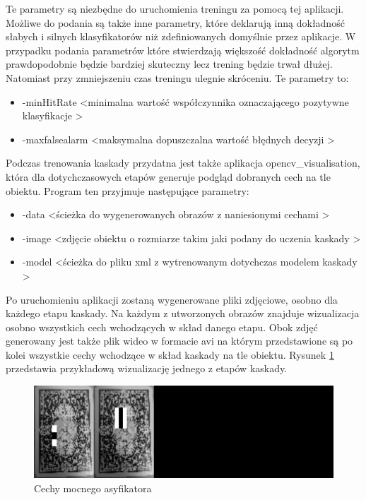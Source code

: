 Te parametry są niezbędne do uruchomienia treningu za pomocą tej aplikacji. Możliwe do podania są także inne parametry, które deklarują inną dokładność słabych i silnych klasyfikatorów niż zdefiniowanych domyślnie przez aplikacje. W przypadku podania parametrów które stwierdzają większość dokładność algorytm prawdopodobnie będzie bardziej skuteczny lecz trening będzie trwał dłużej. Natomiast przy zmniejszeniu czas treningu ulegnie skróceniu. Te parametry to:

\begin{itemize}
	\item -minHitRate \textless minimalna wartość współczynnika oznaczającego pozytywne klasyfikacje \textgreater
	\item -maxfalsealarm \textless maksymalna dopuszczalna wartość błędnych decyzji \textgreater
	
\end{itemize}

Podczas trenowania kaskady przydatna jest także aplikacja opencv\_visualisation, która dla dotychczasowych etapów generuje podgląd dobranych cech na tle obiektu. Program ten przyjmuje następujące parametry:

\begin{itemize}
	\item -data \textless ścieżka do wygenerowanych obrazów z naniesionymi cechami \textgreater
	\item -image \textless zdjęcie obiektu o rozmiarze takim jaki podany do uczenia kaskady \textgreater
	\item -model  \textless ścieżka do pliku xml z wytrenowanym dotychczas modelem kaskady \textgreater
	
\end{itemize}

Po uruchomieniu aplikacji zostaną wygenerowane pliki zdjęciowe, osobno dla każdego etapu kaskady. Na każdym z utworzonych obrazów znajduje wizualizacja osobno wszystkich cech wchodzących w skład danego etapu. Obok zdjęć generowany jest także plik wideo w formacie avi na którym przedstawione są po kolei wszystkie cechy wchodzące w skład kaskady na tle obiektu. Rysunek \ref{visExample} przedstawia przykładową wizualizację jednego z etapów kaskady.

\begin{figure}[H]
	\centering
	\includegraphics[scale=0.1]{imgs/data3stage_1.png}
	\caption{Cechy mocnego asyfikatora}\label{visExample}
\end{figure}


